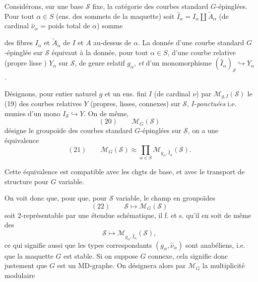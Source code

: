 \documentclass[11pt,a4paper]{article}
\begin{document}
Considérons, sur une base $\mathcal{S}$ fixe, la catégorie  des courbes standard $G$-épinglées. Pour tout $\alpha \in S$ (ens. des sommets de la maquette) soit $\widehat{I}_{\alpha} = I_{\alpha} \amalg \widetilde{A}_{\alpha}$  (de cardinal $\widehat{\nu}_{\alpha}$ = poids total de $\alpha$) somme

des fibres $I_{\alpha}$ et $\widetilde{A}_{\alpha}$ de $I$ et $A$ au-dessus de $\alpha$. La donnée d'une courbe standard $G$-épinglée sur $\mathcal{S}$ équivaut à la donnée, pour tout $\alpha \in S$, d'une courbe relative (propre lisse ) $Y_{\alpha}$ sur $\mathcal{S}$, de genre relatif $g_{\alpha}$, \emph{et} d'un monomorphisme $(\widehat{I}_{\alpha})_{\mathcal{S}} \hookrightarrow Y_{\alpha}$.

Désignons, \struck{\ill{}} pour   entier naturel $g$ et un ens. fini $I$ (de cardinal $\nu$) par $\mathcal{M}_{g,I}(\mathcal{S})$ le   (19) des courbes relatives $Y$ (propres, lisses, connexes) sur $\mathcal{S}$, $I$-\emph{ponctuées} i.e. munies d'un mono $I_{\mathcal{S}} \hookrightarrow Y$. On  de même,
\[
(20)\qquad \mathcal{M}_{G}(\mathcal{S})
\]
désigne le groupoïde des courbes standard $G$-épinglées sur $\mathcal{S}$, on a une équivalence
\[
(21)\qquad \mathcal{M}_{G}(\mathcal{S}) \approx \prod_{\alpha \in S} \mathcal{M}_{g_{\alpha}, \widehat{I}_{\alpha}}(\mathcal{S}) .
\]


Cette équivalence est compatible avec les chgts de base, et avec le transport de structure pour $G$ variable.

On voit donc que, pour que, pour $\mathcal{S}$ variable, le champ en groupoïdes
\[
(22)\qquad \mathcal{S} \longmapsto \mathcal{M}_{G}(\mathcal{S})
\]
soit $2$-représentable par une étendue schématique, il f. et s. qu'il en soit de même des
\[
\mathcal{S} \longmapsto \mathcal{M}_{g_{\alpha}, \widehat{I}_{\alpha}}(\mathcal{S}) ,
\]
ce qui signifie aussi que les types correspondants $(g_{\alpha}, \widehat{\nu}_{\alpha})$ sont anabéliens, i.e. que la maquette $G$  est stable. Si on suppose $G$ connexe, cela signifie donc justement que $G$ est un MD-graphe. On désignera alors par $\mathcal{M}_{G}$ la multiplicité modulaire
\end{document}
